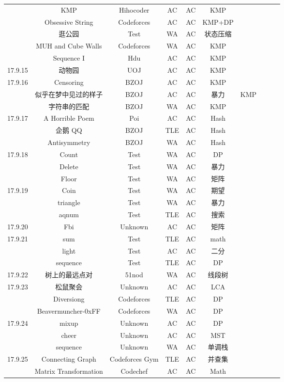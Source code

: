 \documentclass[landscape]{article}
\begin{document}
\begin{longtable}{cccccccccc}
  & KMP & Hihocoder& AC& AC& KMP\\
  & Obsessive String& Codeforces& AC& AC& KMP+DP\\
  & 逛公园 &Test &WA &AC& 状态压缩\\
  & MUH and Cube Walls& Codeforces& WA &AC& KMP\\
  & Sequence I &Hdu &AC &AC& KMP\\
  \hline
  17.9.15 & 动物园 &UOJ& AC& AC &KMP\\
  \hline
  17.9.16 &Censoring& BZOJ& AC& AC& KMP\\
  &似乎在梦中见过的样子 &BZOJ &AC &AC& 暴力 &KMP\\
  &字符串的匹配 &BZOJ &WA& AC &KMP\\
  \hline
  17.9.17 &A Horrible Poem &Poi& AC& AC& Hash\\
  &企鹅 QQ &BZOJ& TLE &AC& Hash\\
  &Antisymmetry& BZOJ &WA& AC& Hash\\
  \hline
  17.9.18 &Count &Test& WA& AC& DP\\
  &Delete &Test& WA& AC &暴力\\
  &Floor& Test& WA& AC& 矩阵\\
  \hline
  17.9.19 &Coin &Test& WA &AC& 期望\\
  &triangle &Test& WA &AC& 暴力\\
  &aqnum &Test& TLE &AC& 搜索\\
  \hline
  17.9.20 & Fbi &Unknown& AC &AC &矩阵\\
  \hline
  17.9.21 & sum& Test& TLE& AC& math\\
  &light& Test& AC& AC& 二分\\
  &sequence& Test &TLE& AC &DP\\
  \hline
  17.9.22 &树上的最远点对& 51nod& WA& AC& 线段树\\
  \hline
  17.9.23 &松鼠聚会 &Unknown &AC& AC &LCA\\
  &Diversiong& Codeforces& TLE &AC &DP\\
  &Beavermuncher-0xFF& Codeforces& WA& AC& DP\\
  \hline
  17.9.24 & mixup& Unknown& AC& AC& DP\\
  & cheer &Unknown &AC& AC &MST\\
  &sequence &Unknown &WA &AC &单调栈\\
  \hline
  17.9.25 &Connecting Graph& Codeforces Gym &TLE &AC& 并查集\\
  &Matrix Transformation& Codechef& AC &AC &Math\\
  \hline

\end{longtable}
\end{document}
